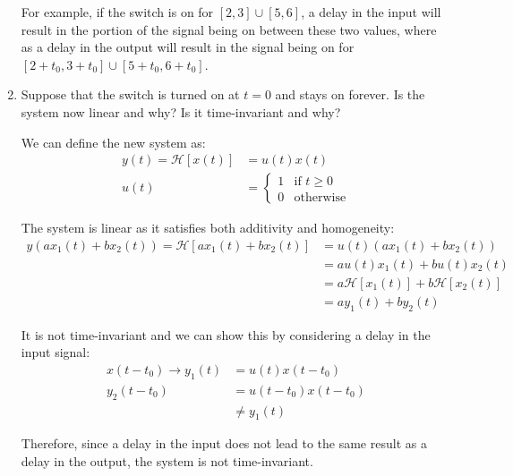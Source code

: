 \documentclass{article}
\begin{document}
\begin{enumerate}[label=5.\arabic*]
    For example, if the switch is on for $[2, 3] \cup [5, 6]$, a delay in the input will result in the portion of the signal being on between these two values, where as a delay in the output will result in the signal being on for $[2+t_0, 3+t_0] \cup [5+t_0, 6+t_0]$.


    \item Suppose that the switch is turned on at $t=0$ and stays on forever. Is the system now linear and why? Is it time-invariant and why?

    We can define the new system as:
    \begin{align*}
        y(t) = \mathcal{H}[x(t)] &= u(t)x(t) \\
        u(t) &= \begin{cases}
            1 & \text{if } t \geq 0 \\
            0 & \text{otherwise}
        \end{cases}
    \end{align*}

    The system is linear as it satisfies both additivity and homogeneity:
    \begin{align*}
        y(ax_1(t) + bx_2(t)) = \mathcal{H}[ax_1(t) + bx_2(t)] &= u(t)(ax_1(t) + bx_2(t)) \\
        &= au(t)x_1(t) + bu(t)x_2(t) \\
        &= a\mathcal{H}[x_1(t)] + b\mathcal{H}[x_2(t)] \\
        &= ay_1(t) + by_2(t)
    \end{align*}

    It is not time-invariant and we can show this by considering a delay in the input signal:
    \begin{align*}
        x(t-t_0) \rightarrow y_1(t) &= u(t)x(t-t_0) \\
        y_2(t-t_0) &= u(t-t_0)x(t-t_0) \\
        &\neq y_1(t)
    \end{align*}

    Therefore, since a delay in the input does not lead to the same result as a delay in the output, the system is not time-invariant.

\end{enumerate}



\end{document}
